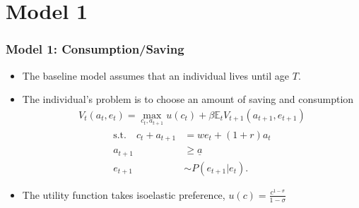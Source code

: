 \documentclass[xcolor=x11names,compress]{beamer}
\renewcommand{\(}{\begin{columns}}
\renewcommand{\)}{\end{columns}}
\newcommand{\<}[1]{\begin{column}{#1}}
\renewcommand{\>}{\end{column}}
\begin{document}
\section{Model 1}
\begin{frame}
\frametitle{Model 1: Consumption/Saving}
\begin{itemize}
\item The baseline model assumes that an individual lives until age $T$.
\item The individual's problem is to choose an amount of saving and consumption
\begin{align*}
V_t(a_{t},e_t) = \max_{c_t,a_{t+1}} u(c_{t}) + \beta \mathbb{E}_t V_{t+1}(a_{t+1},e_{t+1})
\end{align*}
\begin{align*}
\text{s.t.} \quad c_t + a_{t+1} 	&= w e_t + (1+r)a_t \\
a_{t+1} 		&\geq \underline{a}\\
e_{t+1} 		&\sim P(e_{t+1}|e_t).
\end{align*}
\item The utility function takes isoelastic preference, $u(c) = \frac{c^{1-\sigma}}{1-\sigma}$
\end{itemize}
\end{frame}
\end{document}
